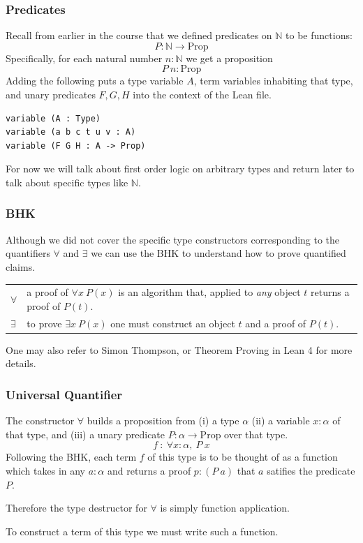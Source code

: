 \documentclass{beamer}
\theoremstyle{indentDefn} \newtheorem{defn}[]{Definition}
\begin{document}
\begin{frame}[fragile]
	\frametitle{Predicates}
Recall from earlier in the course that we defined predicates on $\mathbb{N}$ to be functions: 
$$P : \mathbb{N} \to \text{Prop}$$
Specifically, for each natural number $n:\mathbb{N}$ we get a proposition $$P \ n : \text{Prop}$$
Adding the following puts a type variable $A$, term variables inhabiting that type, and unary predicates $F,G,H$ into the context of the Lean file.
\begin{lstlisting}
variable (A : Type)
variable (a b c t u v : A)
variable (F G H : A -> Prop)
\end{lstlisting}
For now we will talk about first order logic on arbitrary types and return later to talk about specific types like $\mathbb{N}$. 
\end{frame}
\begin{frame}
	\frametitle{BHK}
	
	Although we did not cover the specific type constructors corresponding to the quantifiers $\forall$ and $\exists$ we can use the BHK to understand how to prove quantified claims. 	
	\begin{center}
		\begin{tabular}{p{1.5cm}p{8cm}}
		$\forall$ & a proof of $\forall x \ P(x)$ is an algorithm that, applied to \emph{any} object $t$ returns a proof of $P(t)$.\\
		$\exists$ & to prove $\exists x \ P(x)$ one must construct an object $t$ and a proof of $P(t)$. 
		\end{tabular}
	\end{center}
	
	One may also refer to Simon Thompson, or Theorem Proving in Lean 4 for more details. 	
\end{frame}

\begin{frame}
	\frametitle{Universal Quantifier}
	
	The constructor $\forall$ builds a proposition from (i) a type $\alpha$ (ii) a variable $x : \alpha$ of that type, and (iii) a unary predicate $P : \alpha \to \text{Prop}$ over that type.
	$$f \ : \ \forall x: \alpha, \ P \ x$$
	Following the BHK, each term $f$ of this type is to be thought of as a function which takes in any $a : \alpha$ and returns a proof $p : (P \ a)$ that $a$ satifies the predicate $P$. 
	
	Therefore the type destructor for $\forall$ is simply function application. 
	
	To construct a term of this type we must write such a function. 

\end{frame}
\end{document}
